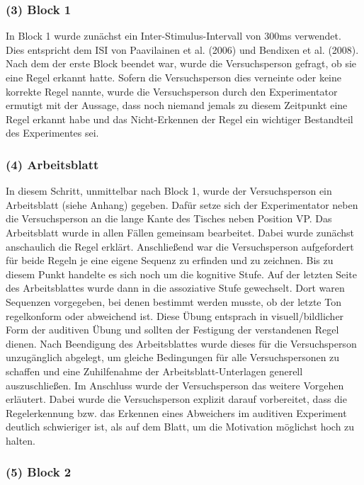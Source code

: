 \documentclass[doc,a4paper,12pt]{apa6}
\begin{document}
\subsubsection{(3) Block 1}

In Block 1 wurde zunächst ein Inter-Stimulus-Intervall von 300ms verwendet. Dies entspricht dem ISI von Paavilainen et al. (2006) und Bendixen et al. (2008). Nach dem der erste Block beendet war, wurde die Versuchsperson gefragt, ob sie eine Regel erkannt hatte. Sofern die Versuchsperson dies verneinte oder keine korrekte Regel nannte, wurde die Versuchsperson durch den Experimentator ermutigt mit der Aussage, dass noch niemand jemals zu diesem Zeitpunkt eine Regel erkannt habe und das Nicht-Erkennen der Regel ein wichtiger Bestandteil des Experimentes sei.

\subsubsection{(4) Arbeitsblatt}

In diesem Schritt, unmittelbar nach Block 1, wurde der Versuchsperson ein Arbeitsblatt (siehe Anhang) gegeben. Dafür setze sich der Experimentator neben die Versuchsperson an die lange Kante des Tisches neben Position VP. Das Arbeitsblatt wurde in allen Fällen gemeinsam bearbeitet. Dabei wurde zunächst anschaulich die Regel erklärt. Anschließend war die Versuchsperson aufgefordert für beide Regeln je eine eigene Sequenz zu erfinden und zu zeichnen. Bis zu diesem Punkt handelte es sich noch um die kognitive Stufe. Auf der letzten Seite des Arbeitsblattes wurde dann in die assoziative Stufe gewechselt. Dort waren Sequenzen vorgegeben, bei denen bestimmt werden musste, ob der letzte Ton regelkonform oder abweichend ist. Diese Übung entsprach in visuell/bildlicher Form der auditiven Übung und sollten der Festigung der verstandenen Regel dienen. Nach Beendigung des Arbeitsblattes wurde dieses für die Versuchsperson unzugänglich abgelegt, um gleiche Bedingungen für alle Versuchspersonen zu schaffen und eine Zuhilfenahme der Arbeitsblatt-Unterlagen generell auszuschließen. Im Anschluss wurde der Versuchsperson das weitere Vorgehen erläutert. Dabei wurde die Versuchsperson explizit darauf vorbereitet, dass die Regelerkennung bzw. das Erkennen eines Abweichers im auditiven Experiment deutlich schwieriger ist, als auf dem Blatt, um die Motivation möglichst hoch zu halten.

\subsubsection{(5) Block 2}
\end{document}
